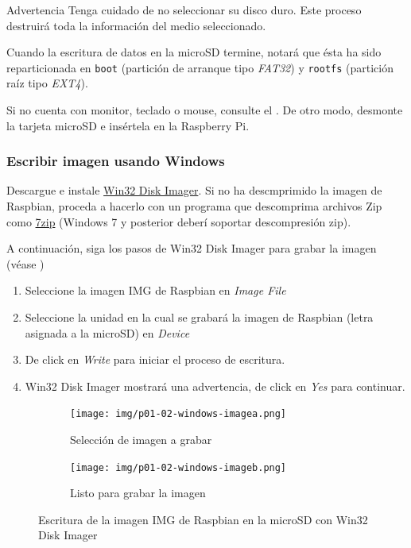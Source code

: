 \documentclass[letterpaper,10.5pt]{article}
\begin{document}
\begin{importantbox}{Advertencia}
Tenga cuidado de no seleccionar su disco duro.
Este proceso destruirá toda la información del medio seleccionado.
\end{importantbox}

Cuando la escritura de datos en la microSD termine, notará que ésta ha sido reparticionada en \texttt{boot} (partición de arranque tipo \textit{FAT32}) y \texttt{rootfs} (partición raíz tipo \textit{EXT4}).

Si no cuenta con monitor, teclado o mouse, consulte el .
De otro modo, desmonte la tarjeta microSD e insértela en la Raspberry Pi.

%
%
\subsubsection{Escribir imagen usando Windows}%
Descargue e instale \href{https://sourceforge.net/projects/win32diskimager/}{Win32 Disk Imager}.
Si no ha descmprimido la imagen de Raspbian, proceda a hacerlo con un programa que descomprima archivos Zip como \href{https://www.7-zip.org/download.html}{7zip} (Windows 7 y posterior deberí soportar descompresión zip).

A continuación, siga los pasos de Win32 Disk Imager para grabar la imagen (véase )
\begin{enumerate}[noitemsep]
	\item Seleccione la imagen IMG de Raspbian en \emph{Image File}
	\item Seleccione la unidad en la cual se grabará la imagen de Raspbian (letra asignada a la microSD) en \emph{Device}
	\item De click en \emph{Write} para iniciar el proceso de escritura.
	\item Win32 Disk Imager mostrará una advertencia, de click en \emph{Yes} para continuar.
\end{enumerate}

\begin{figure}[H]
	\centering%
	\begin{subfigure}[b]{0.5\linewidth}
		\centering
		\texttt{[image: img/p01-02-windows-imagea.png]} %
		\caption{Selección de imagen a grabar}
		\label{fig:write-image-windows-a} %
	\end{subfigure}%
	\begin{subfigure}[b]{0.5\linewidth}
		\centering
		\texttt{[image: img/p01-02-windows-imageb.png]} %
		\caption{Listo para grabar la imagen}
		\label{fig:write-image-windows-b} %
	\end{subfigure}
	\caption{Escritura de la imagen IMG de Raspbian en la microSD con Win32 Disk Imager}%
	\label{fig:write-image-windows} %
\end{figure}
\end{document}
